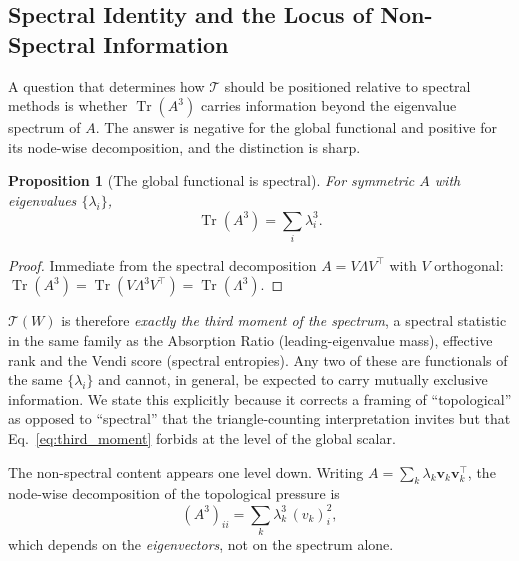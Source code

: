 \documentclass[11pt,a4paper]{article}
\newtheorem{proposition}{Proposition}
\begin{document}
\subsection{Spectral Identity and the Locus of Non-Spectral Information}
\label{sec:spectral}

A question that determines how $\mathcal{T}$ should be positioned relative
to spectral methods is whether $\operatorname{Tr}(A^3)$ carries information
beyond the eigenvalue spectrum of $A$. The answer is negative for the global
functional and positive for its node-wise decomposition, and the distinction
is sharp.

\begin{proposition}[The global functional is spectral]
\label{prop:spectral_identity}
For symmetric $A$ with eigenvalues $\{\lambda_i\}$,
\begin{equation}
\operatorname{Tr}(A^3) = \sum_i \lambda_i^3 .
\label{eq:third_moment}
\end{equation}
\end{proposition}
\begin{proof}
Immediate from the spectral decomposition $A = V\Lambda V^\top$ with
$V$ orthogonal: $\operatorname{Tr}(A^3) = \operatorname{Tr}(V\Lambda^3V^\top)
= \operatorname{Tr}(\Lambda^3)$.
\end{proof}

$\mathcal{T}(W)$ is therefore \emph{exactly the third moment of the
spectrum}, a spectral statistic in the same family as the Absorption
Ratio (leading-eigenvalue mass), effective rank and the Vendi score
(spectral entropies). Any two of these are functionals of the same
$\{\lambda_i\}$ and cannot, in general, be expected to carry mutually
exclusive information. We state this explicitly because it corrects a
framing of ``topological'' as opposed to ``spectral'' that the
triangle-counting interpretation invites but that
Eq.~\eqref{eq:third_moment} forbids at the level of the global scalar.

The non-spectral content appears one level down. Writing
$A = \sum_k \lambda_k \mathbf{v}_k\mathbf{v}_k^\top$, the node-wise
decomposition of the topological pressure is
\begin{equation}
(A^3)_{ii} = \sum_k \lambda_k^3\, (v_k)_i^2 ,
\label{eq:node_decomp}
\end{equation}
which depends on the \emph{eigenvectors}, not on the spectrum alone.
\end{document}
